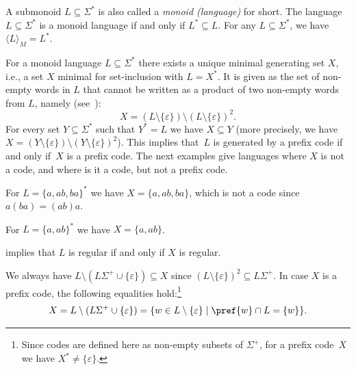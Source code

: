 
A submonoid $L \subseteq \Sigma^*$
is also called a \emph{monoid (language)} for short.
The language $L \subseteq \Sigma^*$
is a monoid language if and only if %
$L^* \subseteq L$.
For any $L \subseteq \Sigma^*$, we have $\langle L \rangle_M = L^*$.

For a monoid language $L \subseteq \Sigma^*$
there exists a unique minimal generating set $X$, i.e., a set $X$ minimal for set-inclusion
with $L = X^*$. It is given as 
the set of non-empty words in $L$ that cannot be written as a product of two non-empty words from $L$, namely (see~\cite[p.~4]{lothaire_1997}):
\begin{equation}
	\label{constr_sync:eqn:generating_set_submonoid}
	X = ( L \setminus \{\varepsilon\} ) \setminus ( L \setminus \{\varepsilon\})^2.
\end{equation}
For every set $Y \subseteq \Sigma^*$
such that $Y^* = L$ we have $X \subseteq Y$ (more precisely,
we have $X = ( Y \setminus \{\varepsilon\} ) \setminus ( Y \setminus \{\varepsilon\})^2$).
This implies that~$L$ is generated by a prefix code 
if and only if~$X$ is a prefix code. The next examples
give languages where $X$ is not a code, and where is it a code, but not a prefix code.

\begin{example}
	For $L = \{a,ab,ba\}^*$ we have $X = \{a,ab,ba\}$, which is not a code since $a(ba) = (ab)a$.
\end{example}

\begin{example}
	For $L = \{a,ab\}^*$ we have $X = \{a,ab\}$. 	
\end{example}

 implies that $L$ is regular if and only if $X$ is regular. 

We always have $L \setminus ( L \Sigma^+ \cup \{\varepsilon \} ) \subseteq X$
since $(L \setminus \{\varepsilon\})^2 \subseteq L\Sigma^+$.
In case $X$ is a prefix code, 
the following equalities hold:\footnote{Since codes are defined here as non-empty subsets of $\Sigma^+$,
	for a prefix code~$X$ we have $X^* \ne \{\varepsilon\}$.}
\begin{equation}\label{constr_sync:eqn:prefix_code_gen}
	X = L \setminus ( L \Sigma^+ \cup \{\varepsilon \} )
	= \{ w \in L \setminus \{\varepsilon\} \mid \pref{w} \cap L = \{ w \} \}.
\end{equation} 

